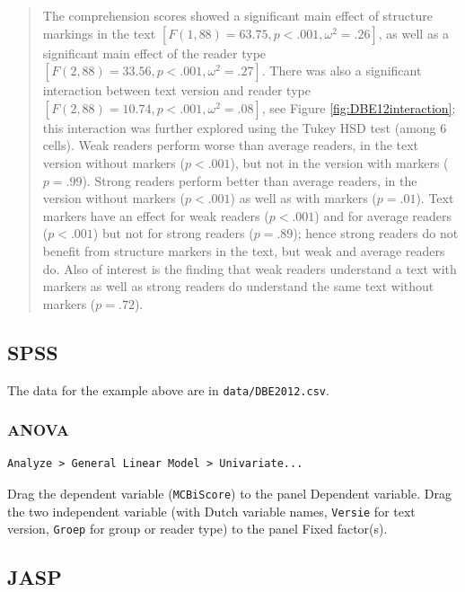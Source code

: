 \documentclass[
]{book}
\begin{document}
\begin{quote}
The comprehension scores showed a significant main effect of structure markings in the text \([F(1,88)=63.75, p<.001, \omega^2=.26]\), as well as a significant main effect of the reader type \([F(2,88)=33.56, p<.001, \omega^2=.27]\).
There was also a significant interaction between text version and reader type \([F(2,88)=10.74, p<.001, \omega^2=.08]\), see Figure \ref{fig:DBE12interaction}; this interaction was further explored using the Tukey HSD test (among 6 cells).
Weak readers perform worse than average readers, in the text version without markers (\(p<.001\)), but not in the version with markers (\(p=.99\)).
Strong readers perform better than average readers, in the version without markers (\(p<.001\)) as well as with markers (\(p=.01\)).
Text markers have an effect for weak readers (\(p<.001\)) and for average readers (\(p<.001\)) but not for strong readers (\(p=.89\)); hence strong readers do not benefit from structure markers in the text, but weak and average readers do.
Also of interest is the finding that weak readers understand a text with markers as well as strong readers do understand the same text without markers (\(p=.72\)).
\end{quote}

\subsection{SPSS}\label{spss-13}

The data for the example above are in \texttt{data/DBE2012.csv}.

\subsubsection{ANOVA}\label{anova-3}

\begin{verbatim}
Analyze > General Linear Model > Univariate...
\end{verbatim}

Drag the dependent variable (\texttt{MCBiScore}) to the panel Dependent
variable. Drag the two independent variable (with Dutch variable names, \texttt{Versie} for text version, \texttt{Groep} for group or reader type) to the panel Fixed factor(s).

\subsection{JASP}\label{jasp-14}
\end{document}
